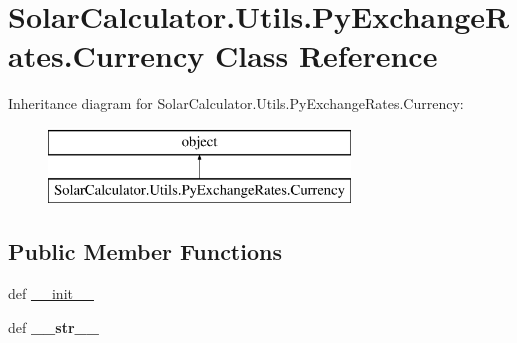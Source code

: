 \hypertarget{class_solar_calculator_1_1_utils_1_1_py_exchange_rates_1_1_currency}{\section{Solar\-Calculator.\-Utils.\-Py\-Exchange\-Rates.\-Currency Class Reference}
\label{class_solar_calculator_1_1_utils_1_1_py_exchange_rates_1_1_currency}
}
Inheritance diagram for Solar\-Calculator.\-Utils.\-Py\-Exchange\-Rates.\-Currency\-:\begin{figure}[H]
\begin{center}
\leavevmode
\includegraphics[height=2.000000cm]{class_solar_calculator_1_1_utils_1_1_py_exchange_rates_1_1_currency}
\end{center}
\end{figure}
\subsection*{Public Member Functions}
\begin{DoxyCompactItemize}
\item 
def \hyperlink{class_solar_calculator_1_1_utils_1_1_py_exchange_rates_1_1_currency_a92e5775a90e61bb694d5a742da645249}{\-\_\-\-\_\-init\-\_\-\-\_\-}
\item 
\hypertarget{class_solar_calculator_1_1_utils_1_1_py_exchange_rates_1_1_currency_aa80e1a707d965dcdb8f7592d6c3c2c86}{def {\bfseries \-\_\-\-\_\-str\-\_\-\-\_\-}}\label{class_solar_calculator_1_1_utils_1_1_py_exchange_rates_1_1_currency_aa80e1a707d965dcdb8f7592d6c3c2c86}

\end{DoxyCompactItemize}
